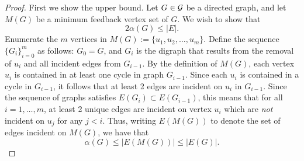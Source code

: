 \documentclass[journal,12pt,onecolumn]{IEEETran}  %
\begin{document}
\begin{proof}
First we show the upper bound.
Let $G\in\mathcal{G}$ be a directed graph, and let $M(G)$ be a minimum feedback vertex set of $G$.
We wish to show that 
\begin{equation}
2\alpha(G)\leq |E|.
\end{equation}
Enumerate the $m$ vertices in $M(G):=\{u_1,u_2,\ldots,u_m\}$.
Define the sequence $\{G_i\}_{i=0}^m$ as follows: $G_0=G$, and $G_i$ is the digraph that results from the removal of $u_i$ and all incident edges from $G_{i-1}$.
By the definition of $M(G)$, each vertex $u_i$ is contained in at least one cycle in graph $G_{i-1}$.
Since each $u_i$ is contained in a cycle in $G_{i-1}$, it follows that at least 2 edges are incident on $u_i$ in $G_{i-1}$.
Since the sequence of graphs satisfies $E(G_{i})\subset E(G_{i-1})$, this means that for all $i=1,\ldots,m$, at least 2 unique edges are incident on vertex $u_i$ which are \emph{not} incident on $u_j$ for any $j<i$.
%
Thus, writing $E(M(G))$ to denote the set of edges incident on $M(G)$, we have that
\begin{equation}
\alpha(G)\leq|E(M(G))|\leq |E(G)|.
\end{equation}


\end{proof}









\end{document}
